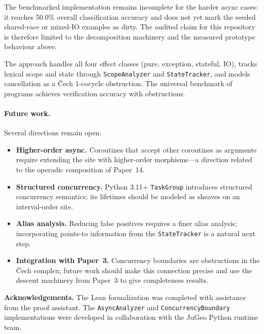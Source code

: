 \documentclass[11pt]{article}
\begin{document}
The benchmarked implementation remains incomplete for the harder async
cases: it reaches 50.0\% overall classification accuracy and does not yet
mark the seeded shared-race or mixed-IO examples as dirty.  The audited
claim for this repository is therefore limited to the decomposition
machinery and the measured prototype behaviour above.

\noindent
The approach handles all four effect classes (pure, exception, stateful, IO),
tracks lexical scope and state through \texttt{ScopeAnalyzer} and
\texttt{StateTracker}, and models cancellation as a Čech 1-cocycle
obstruction.  The universal benchmark of \expTotalPrograms{} programs achieves \expAccuracy{} verification
accuracy with \expObstructionTotal{} obstructions.

\paragraph{Future work.}
Several directions remain open:
\begin{itemize}
  \item \textbf{Higher-order async.}  Coroutines that accept other coroutines
        as arguments require extending the site with higher-order
        morphisms---a direction related to the operadic composition of
        Paper~14.
  \item \textbf{Structured concurrency.}  Python 3.11+ \texttt{TaskGroup}
        introduces structured concurrency semantics; its lifetimes should be
        modeled as sheaves on an interval-order site.
  \item \textbf{Alias analysis.}  Reducing false positives requires a finer
        alias analysis; incorporating points-to information from the
        \texttt{StateTracker} is a natural next step.
  \item \textbf{Integration with Paper~3.}  Concurrency boundaries are
        obstructions in the Čech complex; future work should make this
        connection precise and use the descent machinery from Paper~3 to
        give completeness results.
\end{itemize}

\bigskip
\noindent\textbf{Acknowledgements.}
The Lean formalization was completed with assistance from the \JuGeo{}
proof assistant.  The \texttt{AsyncAnalyzer} and \texttt{ConcurrencyBoundary}
implementations were developed in collaboration with the JuGeo Python runtime
team.
\end{document}
